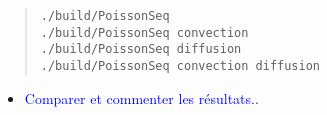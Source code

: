 \documentclass{beamer}
\begin{document}
\begin{frame}[fragile]
\begin{quote}
\color{blue}
\begin{verbatim}
./build/PoissonSeq
./build/PoissonSeq convection
./build/PoissonSeq diffusion
./build/PoissonSeq convection diffusion
\end{verbatim}
\end{quote}

\begin{itemize}		
\item		\textcolor{blue}{Comparer et commenter les r\'esultats.}.
\end{itemize}

\end{frame}
\end{document}
